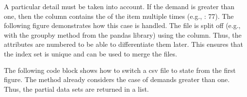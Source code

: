 \documentclass[letterpaper,10pt,english]{sphinxmanual}
\begin{document}

\sphinxAtStartPar
A particular detail must be taken into account. If the demand is greater than one, then the  column contains the
 of the  item multiple times (e.g.,  \sphinxhyphen{} : 77). The following figure demonstrates
how this case is handled. The file is split off (e.g., with the groupby method from the pandas library) using the 
column. Thus, the attributes are numbered to be able to differentiate them later. This ensures that the index set 
is unique and can be used to merge the files.


\sphinxAtStartPar
The following code block shows how to switch a csv file to state  from the first figure. The  method already
considers the case of demands greater than one. Thus, the partial data sets are returned in a list.
\end{document}
